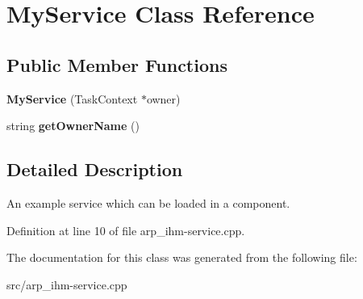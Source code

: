 \hypertarget{classMyService}{
\section{MyService Class Reference}
\label{classMyService}
}
\subsection*{Public Member Functions}
\begin{DoxyCompactItemize}
\item 
\hypertarget{classMyService_a8db2133b0b03855f3871b9c63da03c67}{
{\bfseries MyService} (TaskContext $\ast$owner)}
\label{classMyService_a8db2133b0b03855f3871b9c63da03c67}

\item 
\hypertarget{classMyService_aba1bfbd0c03b725b646ac48754a699fd}{
string {\bfseries getOwnerName} ()}
\label{classMyService_aba1bfbd0c03b725b646ac48754a699fd}

\end{DoxyCompactItemize}


\subsection{Detailed Description}
An example service which can be loaded in a component. 

Definition at line 10 of file arp\_\-ihm-\/service.cpp.



The documentation for this class was generated from the following file:\begin{DoxyCompactItemize}
\item 
src/arp\_\-ihm-\/service.cpp\end{DoxyCompactItemize}
